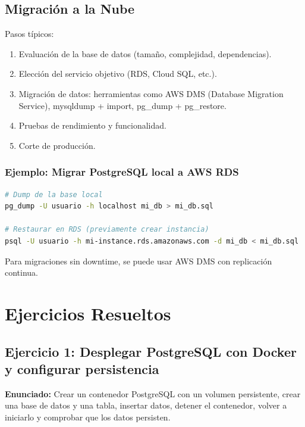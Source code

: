 \documentclass[12pt,a4paper,openany,oneside]{book}
\begin{document}
\section{Migración a la Nube}
Pasos típicos:
\begin{enumerate}
    \item Evaluación de la base de datos (tamaño, complejidad, dependencias).
    \item Elección del servicio objetivo (RDS, Cloud SQL, etc.).
    \item Migración de datos: herramientas como AWS DMS (Database Migration Service), mysqldump + import, pg\_dump + pg\_restore.
    \item Pruebas de rendimiento y funcionalidad.
    \item Corte de producción.
\end{enumerate}

\subsection{Ejemplo: Migrar PostgreSQL local a AWS RDS}
\begin{lstlisting}[language=Bash]
# Dump de la base local
pg_dump -U usuario -h localhost mi_db > mi_db.sql

# Restaurar en RDS (previamente crear instancia)
psql -U usuario -h mi-instance.rds.amazonaws.com -d mi_db < mi_db.sql
\end{lstlisting}
Para migraciones sin downtime, se puede usar AWS DMS con replicación continua.

\chapter{Ejercicios Resueltos}
\section{Ejercicio 1: Desplegar PostgreSQL con Docker y configurar persistencia}
\textbf{Enunciado:} Crear un contenedor PostgreSQL con un volumen persistente, crear una base de datos y una tabla, insertar datos, detener el contenedor, volver a iniciarlo y comprobar que los datos persisten.
\end{document}
